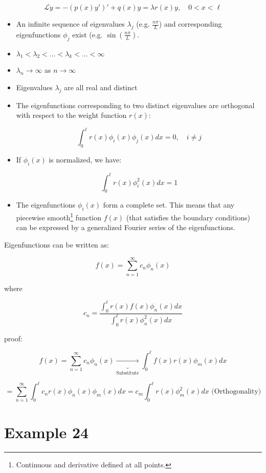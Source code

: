 \documentclass{article}
\begin{document}
$$\mathcal{L} y = - (p(x) y')' + q(x) y = \lambda r(x) y, \quad 0 < x < \ell$$

\begin{itemize}
    \item An infinite sequence of eigenvalues $\lambda_j$ (e.g. $\frac{n \pi}{L}$) and corresponding eigenfunctions $\phi_j$ exist (e.g. $\sin \left( \frac{n \pi}{L} \right)$. 
    \item $\lambda_1 < \lambda_2 < ... < \lambda_k < ... < \infty$
    \item $\lambda_n \to \infty$ as $n \to \infty$
    \item Eigenvalues $\lambda_j$ are all real and distinct
    \item The eigenfunctions corresponding to two distinct eigenvalues are orthogonal with respect to the weight function $r(x)$:
    
    $$\int_0^\ell r(x) \phi_i(x) \phi_j (x) dx = 0, \quad i \neq j$$
    
    \item If $\phi_i(x)$ is normalized, we have:
    
    $$\int_0^\ell r(x) \phi_i^2 (x) dx = 1$$
    
    \item The eigenfunctions $\phi_i (x)$ form a complete set. This means that any piecewise smooth\footnote{Continuous and derivative defined at all points. } function $f(x)$ (that satisfies the boundary conditions) can be expressed by a generalized Fourier series of the eigenfunctions. 
    
\end{itemize}

Eigenfunctions can be written as:

$$f(x) = \sum_{n=1}^\infty c_n \phi_n (x)$$

where

$$c_n = \frac{\int_0^\ell r(x) f(x) \phi_n (x) dx}{\int_0^\ell r(x) \phi_n^2 (x) dx}$$
 
 proof: 
 
 $$f(x) = \sum_{n=1}^\infty c_n \phi_n (x) \underbrace{\longrightarrow}_{\text{Substitute}} \int_0^\ell f(x) r(x) \phi_m (x) dx$$
 
 $$ = \sum_{n=1}^\infty \int_0^\ell c_n r(x) \phi_n(x) \phi_m(x) dx = c_m \int_0^\ell r(x) \phi_m^2(x) dx \text{ (Orthogonality)}$$
 
\section{Example 24}
\end{document}
